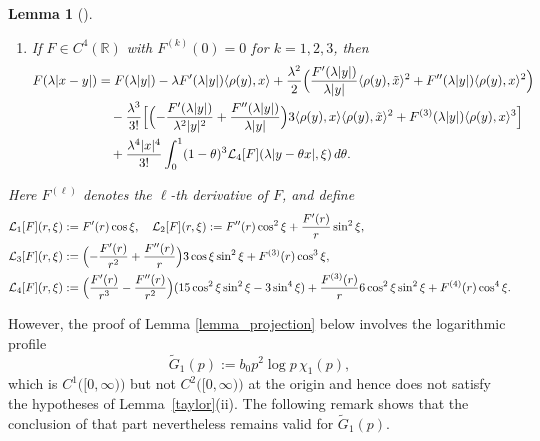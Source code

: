 \documentclass[reqno]{amsart}
\newtheorem{lemma}[theorem]{Lemma}
\numberwithin{equation}{section}
\begin{document}
\begin{lemma}[{\cite[Lemma 3.5]{LSY21}}]
\begin{enumerate}
\item[(iv)] If $F \in C^{4}(\mathbb{R})$ with $F^{(k)}(0)=0$ for $k=1,2,3$, then
$$
\begin{aligned}
F(\lambda|x-y|)
&= F(\lambda|y|) - \lambda F'(\lambda|y|) \langle \rho(y), x \rangle  + \frac{\lambda^{2}}{2} \Bigl( \frac{F'(\lambda|y|)}{\lambda|y|} \langle \rho(y), \tilde{x}\rangle^{2}
+ F''(\lambda|y|) \langle \rho(y), x\rangle^{2} \Bigr) \\
&\quad - \frac{\lambda^{3}}{3!} \Bigl[ \Bigl( -\frac{F'(\lambda|y|)}{\lambda^{2}|y|^{2}}
+ \frac{F''(\lambda|y|)}{\lambda|y|} \Bigr) 3\langle \rho(y), x\rangle \langle \rho(y), \tilde{x}\rangle^{2}
 + F^{(3)}(\lambda|y|) \langle \rho(y), x\rangle^{3} \Bigr] \\
&\quad + \frac{\lambda^{4}|x|^{4}}{3!} \int_{0}^{1} (1-\theta)^{3} \mathcal{L}_{4}[F](\lambda|y-\theta x|, \xi) \, d\theta.
\end{aligned}
$$
\end{enumerate}
Here $F^{(\ell)}$ denotes the $\ell$-th derivative of $F$, and define
\begin{align*}
\mathcal{L}_{1}[F](r,\xi) &:= F'(r)\cos\xi, \ \ \
\mathcal{L}_{2}[F](r,\xi) := F''(r)\cos^{2}\xi + \frac{F'(r)}{r}\sin^{2}\xi, \\
\mathcal{L}_{3}[F](r,\xi) &:= \Bigl( -\frac{F'(r)}{r^{2}} + \frac{F''(r)}{r} \Bigr) 3\cos\xi\sin^{2}\xi + F^{(3)}(r)\cos^{3}\xi, \\
\mathcal{L}_{4}[F](r,\xi) &:= \Bigl( \frac{F'(r)}{r^{3}} - \frac{F''(r)}{r^{2}} \Bigr)(15\cos^{2}\xi\sin^{2}\xi - 3\sin^{4}\xi)
 + \frac{F^{(3)}(r)}{r} 6\cos^{2}\xi\sin^{2}\xi + F^{(4)}(r)\cos^{4}\xi.
\end{align*}
\end{lemma}
However, the proof of Lemma \ref{lemma_projection} below  involves the logarithmic profile
\[
	\widetilde{G}_1(p):=b_0p^2\log p\,\chi_1(p),
\]
which is  \(C^1\bigl([0, \infty)\bigr)\) but not \(C^2\bigl([0, \infty)\bigr)\) at the origin and hence does not satisfy the
hypotheses of Lemma~\ref{taylor}\textup{(ii)}. The following remark
shows that the conclusion of that part nevertheless remains valid for
\(\widetilde{G}_1(p)\).
\end{document}

